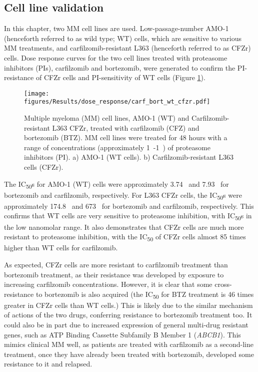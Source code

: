 \subsection{Cell line validation}
In this chapter, two MM cell lines are used.
Low-passage-number AMO-1 (henceforth referred to as wild type; WT) cells, which are sensitive to various MM treatments, and carfilzomib-resistant L363 (henceforth referred to as CFZr) cells.
Dose response curves for the two cell lines treated with proteasome inhibitors (PIs), carfilzomib and bortezomib, were generated to confirm the PI-resistance of CFZr cells and PI-sensitivity of WT cells (Figure \ref{fig:dose_carf_bort}).
\begin{figure}[h]
\centering
\texttt{[image: figures/Results/dose\_response/carf\_bort\_wt\_cfzr.pdf]}
\caption[Carfilzomib and bortezomib dose response curves]{Multiple myeloma (MM) cell lines, AMO-1 (WT) and Carfilzomib-resistant L363 CFZr, treated with carfilzomib (CFZ) and bortezomib (BTZ).
MM cell lines were treated for 48 hours with a range of concentrations (approximately 1\si{\nano\Molar}-1\si{\micro\Molar}) of proteasome inhibitors (PI).
a) AMO-1 (WT cells).
b) Carfilzomib-resistant L363 cells (CFZr).}
\label{fig:dose_carf_bort}
\end{figure}
The IC\textsubscript{50}s for AMO-1 (WT) cells were approximately 3.74\si{\nano\Molar} and 7.93\si{\nano\Molar} for bortezomib and carfilzomib, respectively.
For L363 CFZr cells, the IC\textsubscript{50}s were approximately 174.8\si{\nano\Molar} and 673\si{\nano\Molar} for bortezomib and carfilzomib, respectively.
This confirms that WT cells are very sensitive to proteasome inhibition, with IC\textsubscript{50}s in the low nanomolar range.
It also demonstrates that CFZr cells are much more resistant to proteasome inhibition, with the IC\textsubscript{50} of CFZr cells almost 85 times higher than WT cells for carfilzomib.

As expected, CFZr cells are more resistant to carfilzomib treatment than bortezomib treatment, as their resistance was developed by exposure to increasing carfilzomib concentrations.
However, it is clear that some cross-resistance to bortezomib is also acquired (the IC\textsubscript{50} for BTZ treatment is 46 times greater in CFZr cells than WT cells.)
This is likely due to the similar mechanism of actions of the two drugs, conferring resistance to bortezomib treatment too.
It could also be in part due to increased expression of general multi-drug resistant genes, such as ATP Binding Cassette Subfamily B Member 1 (\textit{ABCB1}).
This mimics clinical MM well, as patients are treated with carfilzomib as a second-line treatment, once they have already been treated with bortezomib, developed some resistance to it and relapsed.

